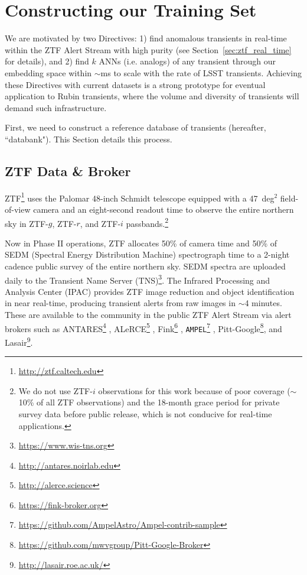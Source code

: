 \documentclass[twocolumn]{aastex63}
\begin{document}
\section{Constructing our Training Set} \label{sec:methodology}

We are motivated by two Directives: 1) find anomalous transients in real-time within the ZTF Alert Stream with high purity (see Section~\ref{sec:ztf_real_time} for details), and 2) find $k$ ANNs (i.e. analogs) of any transient through our embedding space within $\sim$ms to scale with the rate of LSST transients. Achieving these Directives with current datasets is a strong prototype for eventual application to Rubin transients, where the volume and diversity of transients will demand such infrastructure. \par

First, we need to construct a reference database of transients (hereafter, ``databank"). This Section details this process. \par

\subsection{ZTF Data \& Broker} \label{subsec:data_broker}

ZTF\footnote{\url{http://ztf.caltech.edu}} \citep{Bellm2019} uses the Palomar 48-inch Schmidt telescope equipped with a 47~deg$^{2}$ field-of-view camera and an eight-second readout time to observe the entire northern sky in ZTF-$g$, ZTF-$r$, and ZTF-$i$ passbands.\footnote{We do not use ZTF-$i$ observations for this work because of poor coverage ($\sim$10\% of all ZTF observations) and the 18-month grace period for private survey data before public release, which is not conducive for real-time applications.} \par

Now in Phase II operations, ZTF allocates 50\% of camera time and 50\% of SEDM (Spectral Energy Distribution Machine) spectrograph time to a 2-night cadence public survey of the entire northern sky. SEDM spectra are uploaded daily to the Transient Name Server (TNS)\footnote{\url{https://www.wis-tns.org}}. The Infrared Processing and Analysis Center (IPAC) provides ZTF image reduction and object identification in near real-time, producing transient alerts from raw images in $\sim$4 minutes. These are available to the community in the public ZTF Alert Stream via alert brokers such as ANTARES\footnote{\url{http://antares.noirlab.edu}} \citep[Arizona-NOIRLab Temporal Analysis and Response to Events System;][]{Matheson2021}, ALeRCE\footnote{\url{http://alerce.science}} \citep[Automatic Learning for the Rapid Classification of Events;][]{Forster2021}, Fink\footnote{\url{https://fink-broker.org}} \citep{Moller2021}, \texttt{AMPEL}\footnote{\url{https://github.com/AmpelAstro/Ampel-contrib-sample}} \citep[Alert Management, Photometry and Evaluation of Lightcurves;][]{Nordin2019}, Pitt-Google\footnote{\url{https://github.com/mwvgroup/Pitt-Google-Broker}}, and Lasair\footnote{\url{http://lasair.roe.ac.uk/}}. \par
\end{document}
